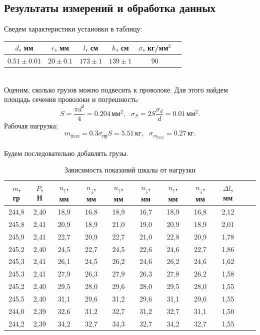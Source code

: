 \documentclass[a4paper]{article}
\begin{document}
\subsection{Результаты измерений и обработка данных}
Сведем характеристики установки в таблицу:
\begin{table}[!h]
\centering
\begin{tabular}{|c|c|c|c|c|c|}
\hline
$d$, мм & $r$, мм & $l$, см & $h$, см & $\sigma$, кг/мм$^2$ \\
\hline
$0.51 \pm 0.01$ & $20 \pm 0.1$ & $173 \pm 1$ & $139 \pm 1$ & 90 \\
\hline
\end{tabular}
\end{table} \\
Оценим, сколько грузов можно подвесить к проволоке. Для этого найдем площадь сечения проволоки и погрешность:
\[
S = \frac{\pi d^2}{4} = 0.204 \, \text{мм}^2, \text{ }\sigma_S = 2S\frac{\sigma_d}{d} = 0.01 \, \text{мм}^2.
\]
Рабочая нагрузка:
\[
m_{\text{max}} = 0.3\sigma_{\text{пр}}S = 5.51 \, \text{кг}, \text{ }\sigma_{m_{\text{max}}} = 0.27 \, \text{кг}.
\] \\
Будем последовательно добавлять грузы.
\begin{table}[!h]
\caption{Зависимость показаний шкалы от нагрузки} 
\centering
\begin{tabular}{|c|c|c|c|c|c|c|c|c|c|c|}
\hline
$m$, гр & $P$, Н & $n_\uparrow$, мм &$n_\downarrow$, мм & $n_\uparrow$, мм &$n_\downarrow$, мм & $n_\uparrow$, мм & $n_\downarrow$, мм & $\Delta l$, мм \\
\hline
244,8&	2,40&	18,9&	16,8&	18,9&	16,7&18,9&	16,8&	2,12\\
\hline
245,8&	2,41&	20,9&	18,9&	21,0&	19,0&	20,9&18,9&	2,01\\
\hline
245,9&	2,41&	22,7&	20,9&	22,7&	21,0&	22,8&	20,9&	1,78\\
\hline
245,2&	2,40&	24,5&	22,7&	24,5&	22,6&	24,6&	22,7&	1,86\\
\hline
245,3&	2,41&	26,1&	24,5&	26,2&	24,6&	26,2&	24,6&	1,62\\
\hline
245,3&	2,41&	27,9&	26,3&	27,9&	26,3&	27,8&	26,2&	1,58\\
\hline
245,2&	2,40&	29,5&	28,0&	29,6&	28,0&	29,5&	28,0&	1,55\\
\hline
245,5&	2,40&	31,1&	29,6&	31,2&	29,6&31,1&	29,6&	1,55\\
\hline
244,0&	2,39&	32,6&	31,2&	32,7&	31,2&	32,7&	31,1&	1,50\\
\hline
244,2&	2,39&	34,2&	32,7&	34,3&	32,7&	34,2&	32,7&1,55\\
\hline
\end{tabular}
\end{table}
\end{document}
